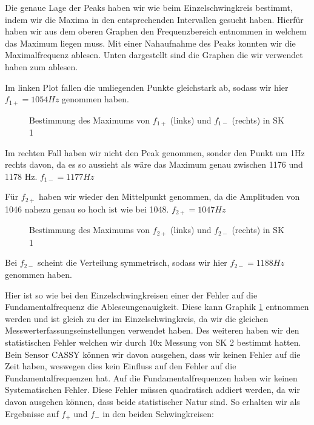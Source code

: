 \documentclass[twoside]{protokoll}
\begin{document}
Die genaue Lage der Peaks haben wir wie beim Einzelschwingkreis bestimmt, indem wir die Maxima in den entsprechenden Intervallen gesucht haben.
Hierfür haben wir aus dem oberen Graphen den Frequenzbereich entnommen in welchem das Maximum liegen muss. Mit einer Nahaufnahme des Peaks konnten wir die Maximalfrequenz ablesen.
Unten dargestellt sind die Graphen die wir verwendet haben zum ablesen.


Im linken Plot fallen die umliegenden Punkte gleichstark ab, sodass wir hier $f_{1+} = 1054 Hz$ genommen haben.
\begin{figure}[H]
    \centering
    \hfill
    \caption{Bestimmung des Maximums von $f_{1+}$ (links) und $f_{1-}$ (rechts) in SK 1}
    \label{Schwebung_Maxima}
\end{figure}
Im rechten Fall haben wir nicht den Peak genommen, sonder den Punkt um 1Hz rechts davon, da es so aussieht als wäre das  Maximum genau zwischen 1176 und 1178 Hz. $f_{1-} = 1177 Hz$
 
Für $f_{2+}$ haben wir wieder den Mittelpunkt genommen, da die Amplituden von 1046 nahezu genau so hoch ist wie bei 1048. $f_{2+} = 1047 Hz$
\begin{figure}[H]
    \centering
    \hfill
    \caption{Bestimmung des Maximums von $f_{2+}$ (links) und $f_{2-}$ (rechts) in SK 1}
\end{figure}
Bei $f_{2-}$ scheint die Verteilung symmetrisch, sodass wir hier $f_{2-} = 1188 Hz$ genommen haben.
 

Hier ist so wie bei den Einzelschwingkreisen einer der Fehler auf die Fundamentalfrequenz die Ableseungenauigkeit. Diese kann Graphik \ref{Schwebung_Maxima} entnommen werden und ist gleich zu der im Einzelschwingkreis, da wir die gleichen Messwerterfassungseinstellungen verwendet haben.
Des weiteren haben wir den statistischen Fehler welchen wir durch 10x Messung von SK 2 bestimmt hatten. \\

Bein Sensor CASSY können wir davon ausgehen, dass wir keinen Fehler auf die Zeit haben, weswegen dies kein Einfluss auf den Fehler auf die Fundamentalfrequenzen hat.
Auf die Fundamentalfrequenzen haben wir keinen Systematischen Fehler.
Diese Fehler müssen quadratisch addiert werden, da wir davon ausgehen können, dass beide statistischer Natur sind.
So erhalten wir als Ergebnisse auf $ f_+$ und $ f_-$ in den beiden Schwingkreisen:
\end{document}
